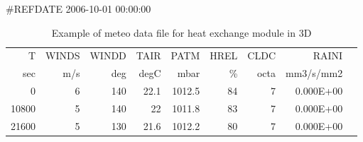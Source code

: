 \begin{table}[h]
\#REFDATE 2006-10-01 00:00:00\\
  \centering
  \begin{tabular}{rrrrrrrrr}
   T     & WINDS & WINDD & TAIR & PATM   & HREL & CLDC & RAINI     \\
    sec  & m/s   & deg   & degC & mbar   & \%   & octa & mm3/s/mm2 \\
       0 & 6     & 140   & 22.1 & 1012.5 & 84   & 7    & 0.000E+00 \\
   10800 & 5     & 140   & 22   & 1011.8 & 83   & 7    & 0.000E+00 \\
   21600 & 5     & 130   & 21.6 & 1012.2 & 80   & 7    & 0.000E+00 \\
   \end{tabular}
  \caption{Example of meteo data file for heat exchange module in 3D}\label{tab:meteo3d}
\end{table}
